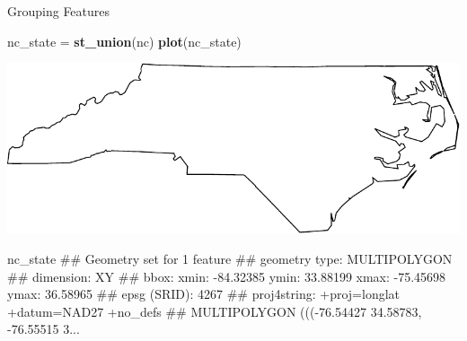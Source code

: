 \documentclass[11pt,ignorenonframetext,]{beamer}
\newenvironment{Shaded}{}{}
\newcommand{\KeywordTok}[1]{\textcolor[rgb]{0.00,0.44,0.13}{\textbf{#1}}}
\newcommand{\NormalTok}[1]{#1}
\newcommand{\StringTok}[1]{\textcolor[rgb]{0.25,0.44,0.63}{#1}}
\let\oldShaded\Shaded
\let\endoldShaded\endShaded
\renewenvironment{Shaded}{\footnotesize\begin{spacing}{0.9}\oldShaded}{\endoldShaded\end{spacing}}
\let\oldverbatim\verbatim
\let\endoldverbatim\endverbatim
\newcommand{\scriptoutput}{
  \renewenvironment{Shaded}{\scriptsize\begin{spacing}{0.9}\oldShaded}{\endoldShaded\end{spacing}}
  \renewenvironment{verbatim}{\scriptsize\begin{spacing}{0.9}\oldverbatim}{\endoldverbatim\end{spacing}}
}
\begin{document}
\begin{frame}[fragile,t]{Grouping Features}
\protect\hypertarget{grouping-features}{}

\scriptoutput

\begin{Shaded}
\begin{Highlighting}[]
\NormalTok{nc_state =}\StringTok{ }\KeywordTok{st_union}\NormalTok{(nc)}
\KeywordTok{plot}\NormalTok{(nc_state)}
\end{Highlighting}
\end{Shaded}

\begin{center}\includegraphics[width=\textwidth]{Lec16_files/figure-beamer/unnamed-chunk-23-1} \end{center}

\begin{Shaded}
\begin{Highlighting}[]

\NormalTok{nc_state}
\NormalTok{## Geometry set for 1 feature }
\NormalTok{## geometry type:  MULTIPOLYGON}
\NormalTok{## dimension:      XY}
\NormalTok{## bbox:           xmin: -84.32385 ymin: 33.88199 xmax: -75.45698 ymax: 36.58965}
\NormalTok{## epsg (SRID):    4267}
\NormalTok{## proj4string:    +proj=longlat +datum=NAD27 +no_defs}
\NormalTok{## MULTIPOLYGON (((-76.54427 34.58783, -76.55515 3...}
\end{Highlighting}
\end{Shaded}

\end{frame}
\end{document}
